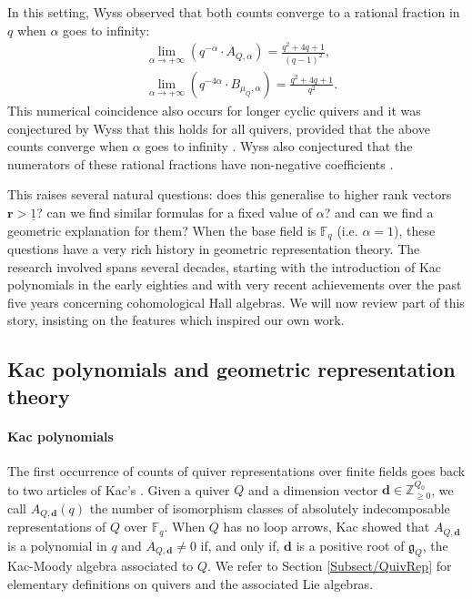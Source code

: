 \documentclass[11pt,english]{article}
\numberwithin{equation}{section}
\numberwithin{figure}{section}
\theoremstyle{definition}
\theoremstyle{plain}
\theoremstyle{remark}
\newcommand\dd{\mathbf{d}}
\newcommand\rr{\mathbf{r}}
\newcommand\ZZ{\mathbb{Z}}
\newcommand\FF{\mathbb{F}}
\begin{document}
In this setting, Wyss observed that both counts converge to a rational
fraction in $q$ when $\alpha$ goes to infinity:\begin{align*}
& \underset{\alpha\rightarrow +\infty}{\lim}\left( q^{-\alpha}\cdot A_{Q,\alpha}\right) = \frac{q^2+4q+1}{(q-1)^2}, \\
& \underset{\alpha\rightarrow +\infty}{\lim}\left( q^{-4\alpha}\cdot B_{\mu_Q,\alpha}\right) = \frac{q^2+4q+1}{q^2}.
\end{align*}This numerical coincidence also occurs for longer cyclic quivers and
it was conjectured by Wyss that this holds for all quivers, provided
that the above counts converge when $\alpha$ goes to infinity \cite[Conj. 4.37.]{Wys17b}.
Wyss also conjectured that the numerators of these rational fractions
have non-negative coefficients \cite[Conj. 4.32.]{Wys17b}.

This raises several natural questions: does this generalise to higher
rank vectors $\rr>\underline{1}$? can we find similar formulas for
a fixed value of $\alpha$? and can we find a geometric explanation
for them? When the base field is $\FF_{q}$ (i.e. $\alpha=1$), these
questions have a very rich history in geometric representation theory.
The research involved spans several decades, starting with the introduction
of Kac polynomials in the early eighties and with very recent achievements
over the past five years concerning cohomological Hall algebras. We
will now review part of this story, insisting on the features which
inspired our own work.

\subsection*{Kac polynomials and geometric representation theory}

\paragraph*{Kac polynomials}

The first occurrence of counts of quiver representations over finite
fields goes back to two articles of Kac's \cite{Kac80,Kac82}. Given
a quiver $Q$ and a dimension vector $\dd\in\ZZ_{\geq0}^{Q_{0}}$,
we call $A_{Q,\dd}(q)$ the number of isomorphism classes of absolutely
indecomposable representations of $Q$ over $\FF_{q}$. When $Q$
has no loop arrows, Kac showed that $A_{Q,\dd}$ is a polynomial in
$q$ and $A_{Q,\dd}\ne0$ if, and only if, $\dd$ is a positive root
of $\mathfrak{g}_{Q}$, the Kac-Moody algebra associated to $Q$.
We refer to Section \ref{Subsect/QuivRep} for elementary definitions
on quivers and the associated Lie algebras. \index[notations]{a@$A_{Q,\dd}$ - Kac polynomials}
\end{document}
